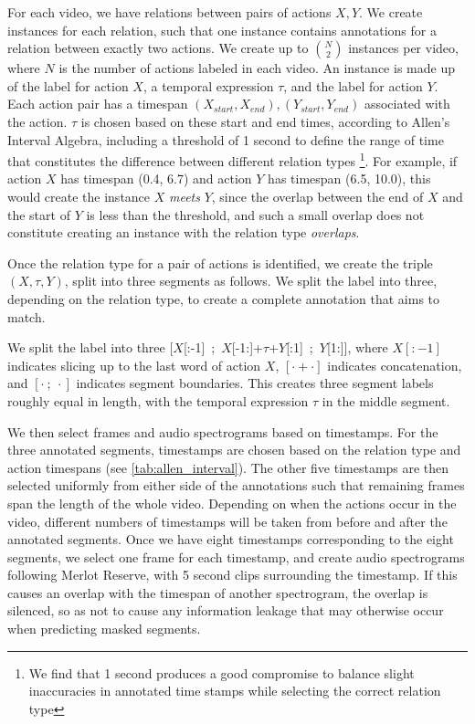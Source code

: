 For each video, we have relations between pairs of actions $X, Y$.  We create
instances for each relation, such that one instance contains annotations for a
relation between exactly two actions. We create up to $\binom{N}{2}$ instances
per video, where $N$ is the number of actions labeled in each video. An
instance is made up of the label for action $X$, a temporal expression $\tau$,
and the label for action $Y$. Each action pair has a timespan $(X_{start},
X_{end}), (Y_{start}, Y_{end})$ associated with the action. $\tau$ is chosen
based on these start and end times, according to Allen's Interval Algebra,
including a threshold of 1 second to define the range of time that constitutes
the difference between different relation types \footnote{We find that 1 second
produces a good compromise to balance slight inaccuracies in annotated time
stamps while selecting the correct relation type}. For example, if action $X$
has timespan (0.4, 6.7) and action $Y$ has timespan (6.5, 10.0), this would
create the instance $X$ \textit{meets} $Y$, since the overlap between the end
of $X$ and the start of $Y$ is less than the threshold, and such a small
overlap does not constitute creating an instance with the relation type
\textit{overlaps}.

\begin{sloppypar}
Once the relation type for a pair of actions is identified, we create the
triple $(X,\tau,Y)$, split into three segments as follows. We split the label
into three, depending on the relation type, to create a complete annotation
that aims to match.

We split the label into three
\mbox{[$X$[:-1]~;~$X$[-1:]+$\tau$+$Y$[:1]~;~$Y$[1:]]}, where $X[:-1]$ indicates
slicing up to the last word of action $X$, $[\cdot+\cdot]$ indicates
concatenation, and $[\cdot~;~\cdot]$ indicates segment boundaries. This
creates three segment labels roughly equal in length, with the temporal expression
$\tau$ in the middle segment.
\end{sloppypar}

We then select frames and audio spectrograms based on timestamps. For the three
annotated segments, timestamps are chosen based on the relation type and action
timespans (see \cref{tab:allen_interval}). The other five timestamps are then
selected uniformly from either side of the annotations such that remaining
frames span the length of the whole video. Depending on when the actions occur
in the video, different numbers of timestamps will be taken from before and
after the annotated segments. Once we have eight timestamps corresponding to
the eight segments, we select one frame for each timestamp, and create audio
spectrograms following Merlot Reserve, with 5 second clips surrounding the
timestamp. If this causes an overlap with the timespan of another spectrogram,
the overlap is silenced, so as not to cause any information leakage that may
otherwise occur when predicting masked segments.

